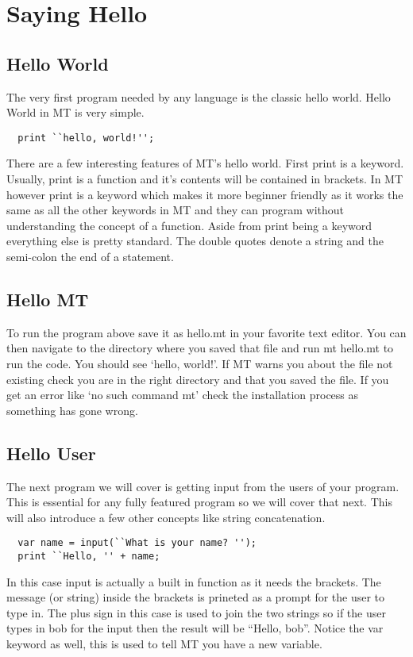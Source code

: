 \documentclass{report}
\begin{document}
\section{Saying Hello}
\subsection{Hello World}
The very first program needed by any language is the classic hello world. Hello World in MT is very simple.
\begin{lstlisting}
  print ``hello, world!'';
\end{lstlisting}
There are a few interesting features of MT's hello world. First print is a keyword. Usually, print is a function and it's contents will be contained in brackets. In MT however print is a keyword which makes it more beginner friendly as it works the same as all the other keywords in MT and they can program without understanding the concept of a function. Aside from print being a keyword everything else is pretty standard. The double quotes denote a string and the semi-colon the end of a statement.

\subsection{Hello MT}
To run the program above save it as hello.mt in your favorite text editor. You can then navigate to the directory where you saved that file and run mt hello.mt to run the code. You should see `hello, world!'. If MT warns you about the file not existing check you are in the right directory and that you saved the file. If you get an error like `no such command mt' check the installation process as something has gone wrong.

\subsection{Hello User}
The next program we will cover is getting input from the users of your program. This is essential for any fully featured program so we will cover that next. This will also introduce a few other concepts like string concatenation.

\begin{lstlisting}
  var name = input(``What is your name? '');
  print ``Hello, '' + name;
\end{lstlisting}

In this case input is actually a built in function as it needs the brackets. The message (or string) inside the brackets is prineted as a prompt for the user to type in. The plus sign in this case is used to join the two strings so if the user types in bob for the input then the result will be ``Hello, bob''. Notice the var keyword as well, this is used to tell MT you have a new variable.
\end{document}
